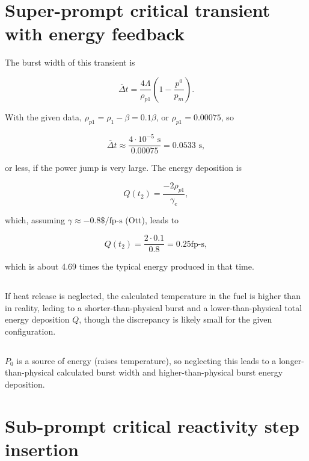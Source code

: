 \documentclass{hw-template}
\begin{document}
\section{Super-prompt critical transient with energy feedback}\label{sec:second}

The burst width of this transient is

\begin{equation}
   \overline{\Delta}t =  \frac{4 \Lambda}{\rho_{p1}} \left(1 - \frac{p^0}{p_m} \right).
\end{equation}

With the given data, $\rho_{p1} = \rho_1 - \beta = 0.1\beta$, or $\rho_{p1} = 0.00075$, so

\begin{equation}
    \overline{\Delta}t \approx \frac{4 \cdot 10^{-5} \text{ s}}{0.00075} = 0.0533 \text{ s},
\end{equation}

or less, if the power jump is very large. The energy deposition is

\begin{equation}
    Q(t_2) = \frac{-2\rho_{p1}}{\gamma_e},
\end{equation}

which, assuming $\gamma \approx -0.8\$/\text{fp-s}$ (Ott), leads to 

\begin{equation}
    Q(t_2) = \frac{2 \cdot 0.1}{0.8} = 0.25 \text{fp-s},
\end{equation}

which is about 4.69 times the typical energy produced in that time.

\subsection{} If heat release is neglected, the calculated temperature in the fuel is higher than in reality, leding to a shorter-than-physical burst and a lower-than-physical total energy deposition $Q$, though the discrepancy is likely small for the given configuration.

\subsection{} $P_0$ is a source of energy (raises temperature), so neglecting this leads to a longer-than-physical calculated burst width and higher-than-physical burst energy deposition.

\section{Sub-prompt critical reactivity step insertion}
\end{document}

